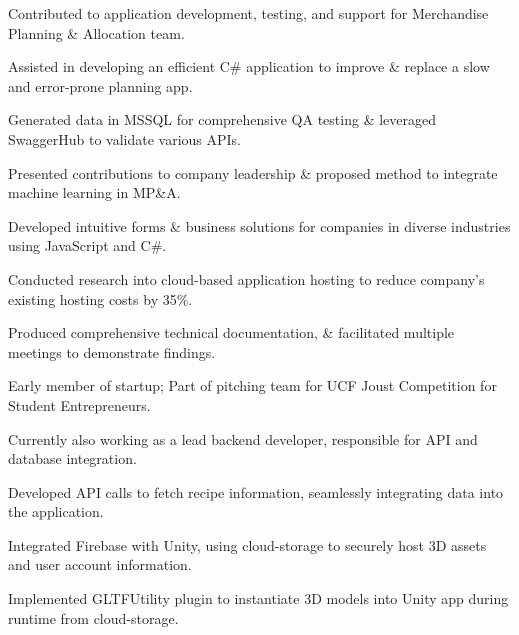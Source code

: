 \documentclass[]{deedy-resume-openfont}
\begin{document}
\begin{tightemize}
\item Contributed to application development, testing, and support for Merchandise Planning \& Allocation team.
\item  Assisted in developing an efficient C\# application to improve \& replace a slow and error-prone planning app. 
\item  Generated data in MSSQL for comprehensive QA testing \& leveraged SwaggerHub to validate various APIs.
\item Presented contributions to company leadership \& proposed method to integrate machine learning in MP\&A.

\end{tightemize}
\sectionsep

\begin{tightemize}
\item Developed intuitive forms \& business solutions for companies in diverse industries using JavaScript and C\#.
\item Conducted research into cloud-based application hosting to reduce company's existing hosting costs by 35\%.
\item Produced comprehensive technical documentation, \& facilitated multiple meetings to demonstrate findings.
\end{tightemize}



\begin{tightemize}
\item Early member of startup; Part of pitching team for UCF Joust Competition for Student Entrepreneurs. 
\item Currently also working as a lead backend developer, responsible for API and database integration. 
\item Developed API calls to fetch recipe information, seamlessly integrating data into the application.
\item Integrated Firebase with Unity, using cloud-storage to securely host 3D assets and user account information.
\item Implemented GLTFUtility plugin to instantiate 3D models into Unity app during runtime from cloud-storage.
\end{tightemize}
\vspace{8pt}
\end{document}
